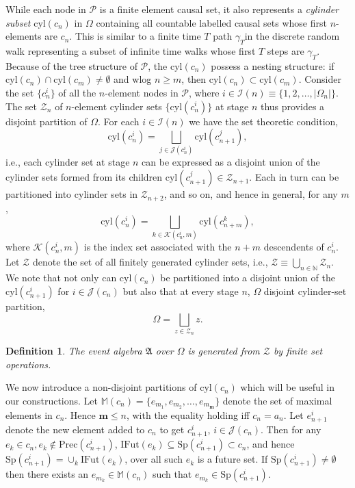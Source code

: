 \documentclass[11pt]{article}
\newtheorem*{definition}{Definition}
\newcommand{\cyl}[1]{{\mathrm{cyl}({#1})}}
\newcommand{\cP}{\mathcal P}
\newcommand{\cZ}{\mathcal Z}
\newcommand{\fA}{\mathfrak A}
\newcommand{\bN}{\mathbb N}
\newcommand{\achain}{a}
\newcommand{\cI}{\mathcal I}
\newcommand{\cJ}{\mathcal J}
\newcommand{\cK}{\mathcal K}
\newcommand{\IFut}{\mathrm{IFut}}
\newcommand{\pre}{\mathrm{Prec}}
\newcommand{\spec}{\mathrm{Sp}}
\newcommand{\mm}{\mathbb{M}}
\newcommand{\bmm}{{\mathbf m}}
\newcommand{\nin}{\not \in}
\begin{document}
While each node in $\cP$ is a finite element causal set, it also
represents a {\sl cylinder subset} $\cyl{c_n}$ in $\Omega$ containing
all countable labelled causal sets  whose  first $n$-elements are
$c_n$. This is similar to a finite time $T$ path $\gamma_T$in the discrete random
walk representing a subset of infinite time walks whose first $T$
steps are $\gamma_T$.  Because of the tree structure of $\cP$, the
$\cyl{c_n}$ possess a  nesting structure: if  $\cyl{c_n} \cap
\cyl{c_m}  \neq \emptyset$ and wlog $n\geq m$, then $\cyl{c_n}\subset
\cyl{c_m}$.   Consider the set $\{c_n^i\}$ of all the
$n$-element nodes in $\cP$, where $i \in \cI(n) \equiv \{1, 2, \ldots, |\Omega_n| \}
$.   The set $\cZ_n$ of $n$-element cylinder sets $\{\cyl{c_n^i} \}$ at
stage $n$ thus provides a disjoint  partition of $\Omega$. For each $i
\in \cI(n)$ we have the set theoretic condition,
\begin{equation}
\cyl{c_n^i} = \bigsqcup_{j \in \cJ(c_n^i)} \cyl{c_{n+1}^j}, \label{cylpart.eq} 
  \end{equation} 
i.e., each cylinder set at stage $n$ can be expressed as a disjoint
union of the cylinder sets formed from its children $\cyl{c_{n+1}^j}
\in \cZ_{n+1}$. 
Each in turn can be partitioned into cylinder sets in $\cZ_{n+2}$, and
so on, and hence in general, for any $m$, 
\begin{equation}
\cyl{c_n^i} = \bigsqcup_{k\in \cK(c_n^i,m)}
\cyl{c_{n+m}^k}, \label{gencylpart.eq} 
  \end{equation} 
where $\cK(c_n^i,m)$ is the index set associated with the $n+m$
descendents of $c_n^i$. Let $\cZ$ denote the set of all finitely
generated cylinder sets, i.e., $\cZ \equiv \bigcup_{n \in \bN} \cZ_n$. 
We note that not only can $\cyl{c_n}$ be
partitioned into a disjoint union of the $\cyl{c_{n+1}^i}$ for $i \in
\cJ(c_n)$  but also that at every stage $n$,    $\Omega$ 
disjoint cylinder-set partition, 
\begin{equation}
\Omega=\bigsqcup_{z \in \cZ_n} z. 
\end{equation}

\begin{definition}
  The event
algebra  $\fA$ over $\Omega$ is generated from $\cZ$ by finite set operations.  
\end{definition} 


We now introduce a non-disjoint partitions of $\cyl{c_n}$
which will be useful in our constructions.
Let $\mm(c_n)=\{e_{m_1}, e_{m_2}, \ldots, e_{m_\bmm} \}$ denote the set of maximal elements in $c_n$. Hence
$\bmm \leq n $, with the equality holding iff
$c_n=\achain_n$. Let $e_{n+1}^i$ denote the new element added to $c_n$
to get $c_{n+1}^i$, $i \in \cJ(c_n)$. Then for any $e_k \in c_n, e_k
\nin \pre(c_{n+1}^i)$, $\IFut(e_k) \subseteq \spec(c_{n+1}^i) \subset
c_n$, and hence $\spec(c_{n+1}^i)=\cup_k \IFut(e_k) $, over all such
$e_k$ is a future set.  If $\spec(c_{n+1}^i) \neq \emptyset$ then there exists an $e_{m_k}
\in \mm(c_n)$ such that $e_{m_k} \in \spec(c_{n+1}^i)$.
\end{document}
